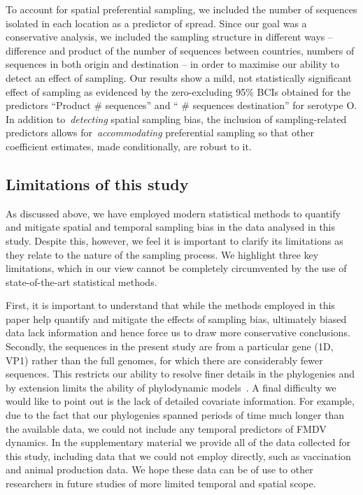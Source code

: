 \documentclass[10pt]{article}
\begin{document}
To account for spatial preferential sampling, we included the number of sequences isolated in each location as a predictor of spread. 
Since our goal was a conservative analysis, we included the sampling structure in different ways -- difference and product of the number of sequences between countries, numbers of sequences in both origin and destination -- in order to maximise our ability to detect an effect of sampling.
Our results show a mild, not statistically significant effect of sampling as evidenced by the zero-excluding 95\% BCIs obtained for the predictors ``Product \# sequences'' and `` \# sequences destination'' for serotype O.
In addition to~\textit{detecting} spatial sampling bias, the inclusion of sampling-related predictors allows for~\textit{accommodating} preferential sampling so that other coefficient estimates, made conditionally, are robust to it. 

\subsection*{Limitations of this study}

As discussed above, we have employed modern statistical methods to quantify and mitigate spatial and temporal sampling bias in the data analysed in this study.
Despite this, however, we feel it is important to clarify its limitations as they relate to the nature of the sampling process.
We highlight three key limitations, which in our view cannot be completely circumvented by the use of state-of-the-art statistical methods. 
 
First, it is important to understand that while the methods employed in this paper help quantify and mitigate the effects of sampling bias, ultimately biased data lack information and hence force us to draw more conservative conclusions.
Secondly, the sequences in the present study are from a particular gene (1D, VP1) rather than the full genomes, for which there are considerably fewer sequences.
This restricts our ability to resolve finer details in the phylogenies and by extension limits the ability of phylodynamic models~\cite{Dudas2019}.
A final difficulty we would like to point out is the lack of detailed covariate information.
For example, due to the fact that our phylogenies spanned periods of time much longer than the available data, we could not include any temporal predictors of FMDV dynamics.
In the supplementary material we provide all of the data collected for this study, including data that we could not employ directly, such as vaccination and animal production data.
We hope these data can be of use to other researchers in future studies of more limited temporal and spatial scope.
\end{document}
